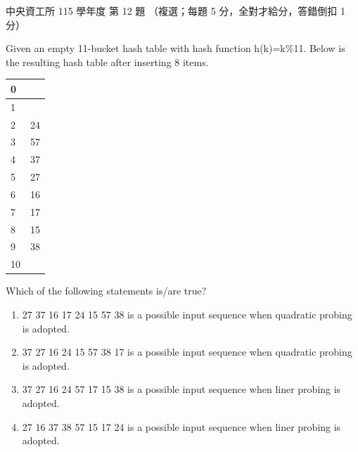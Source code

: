 \begin{pastexam}[label={px:ncu-115-dsa-12}]{中央資工所 115 學年度 第 12 題}
（複選；每題 5 分，全對才給分，答錯倒扣 1 分）

Given an empty 11-bucket hash table with hash function h(k)=k\%11. Below is the resulting hash table after inserting 8 items.
\begin{center}
\begin{tabular}{|l|l|}
\hline
0 & \\ \hline
1 & \\ \hline
2 & 24 \\ \hline
3 & 57 \\ \hline
4 & 37 \\ \hline
5 & 27 \\ \hline
6 & 16 \\ \hline
7 & 17 \\ \hline
8 & 15 \\ \hline
9 & 38 \\ \hline
10 & \\ \hline
\end{tabular}
\end{center}
Which of the following statements is/are true?
\begin{enumerate}[label=\Alph*.]
\item 27 37 16 17 24 15 57 38 is a possible input sequence when quadratic probing is adopted.
\item 37 27 16 24 15 57 38 17 is a possible input sequence when quadratic probing is adopted.
\item 37 27 16 24 57 17 15 38 is a possible input sequence when liner probing is adopted.
\item 27 16 37 38 57 15 17 24 is a possible input sequence when liner probing is adopted.
\end{enumerate}
\end{pastexam}

